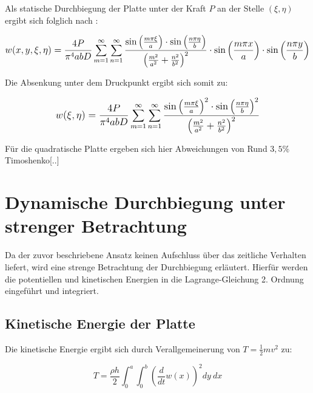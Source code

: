Als statische Durchbiegung der Platte unter der Kraft $P$ an der Stelle $(\xi, \eta)$ ergibt sich folglich nach :
 
\begin{equation}
 \mathlarger{
 	w(x,y,\xi,\eta) = \frac{4P}{\pi^4 a b D} 
 	\sum_{m = 1}^{\infty} \sum_{n = 1}^{\infty}
 	\dfrac{
 		\sin\left(\frac{m \pi \xi}{a}\right) 
 		\cdot \sin\left(\frac{n \pi \eta}{b}\right) 
 	}{
 		\left( 
 		\frac{m^2}{a^2} +
 		\frac{n^2}{b^2}
 		\right)^2
 	}
 	\cdot \sin\left(\frac{m \pi x}{a}\right) 
 	\cdot \sin\left(\frac{n \pi y}{b}\right) 
 }
 \end{equation}

Die Absenkung unter dem Druckpunkt ergibt sich somit zu:

\begin{equation}
 \mathlarger{
	w(\xi,\eta) = \frac{4P}{\pi^4 a b D} 
	\sum_{m = 1}^{\infty} \sum_{n = 1}^{\infty}
	\dfrac{
		\sin\left(\frac{m \pi \xi}{a}\right)^2 
		\cdot 	\sin\left(\frac{n \pi \eta}{b}\right) ^2
	}{
		\left( 
		\frac{m^2}{a^2} +
		\frac{n^2}{b^2}
		\right)^2
	}
}
\end{equation}


Für die quadratische Platte ergeben sich hier Abweichungen von Rund $3,5\%$ Timoshenko[..]


\section{Dynamische Durchbiegung unter strenger Betrachtung}

Da der zuvor beschriebene Ansatz keinen Aufschluss über das zeitliche Verhalten liefert, wird eine strenge Betrachtung der Durchbiegung erläutert. Hierfür werden die potentiellen und kinetischen Energien in die Lagrange-Gleichung 2. Ordnung eingeführt und integriert.

\subsection{Kinetische Energie der Platte}

Die kinetische Energie ergibt sich durch Verallgemeinerung von $T = \frac{1}{2} mv^2$ zu:

\begin{equation}
T = \dfrac{\rho h}{2} \int_{0}^{a} \int_{0}^{b} \left(\dfrac{d}{dt} w(x)\right)^2 dy \ dx
\end{equation}


